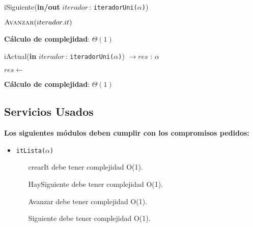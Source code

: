 \documentclass[10pt, a4paper]{article}
\let\TipoVariable=\texttt
\let\ModificadorArgumento=\textbf
\newcommand{\In}[2]{\ModificadorArgumento{in} \ensuremath{#1}\,: \TipoVariable{#2}\xspace}
\newcommand{\Inout}[2]{\ModificadorArgumento{in/out} \ensuremath{#1}\,: \TipoVariable{#2}\xspace}
\newcommand{\DRef}{\ensuremath{\rightarrow}}
\begin{document}
\begin{algorithm}[H]
\caption*{iSiguiente(\Inout{iterador}{iteradorUni($\alpha$)})}
\begin{algorithmic}[1]
	\State $\Call{Avanzar}{iterador.it}$
\end{algorithmic}
	\textbf{C\'alculo de complejidad}: $\Theta(1)$
\end{algorithm}

\begin{algorithm}[H]
\caption*{iActual(\In{iterador}{iteradorUni($\alpha$)}) $\DRef res$ : {$\alpha$}}
\begin{algorithmic}[1]
	\State $res \gets$ 
\end{algorithmic}
	\textbf{C\'alculo de complejidad}: $\Theta(1)$
\end{algorithm}

\subsection{Servicios Usados}

\textbf{Los siguientes m\'odulos deben cumplir con los compromisos pedidos:}

\begin{itemize}
	\item \TipoVariable{itLista($\alpha$)}
	\begin{itemize}
		\item[crearIt] debe tener complejidad O(1).
		\item[HaySiguiente] debe tener complejidad O(1).
		\item[Avanzar] debe tener complejidad O(1).
		\item[Siguiente] debe tener complejidad O(1).
	\end{itemize} 
\end{itemize}
\end{document}
